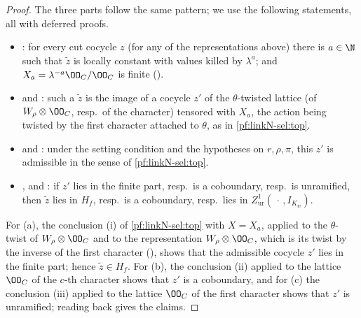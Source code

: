 \begin{proof}
The three parts follow the same pattern; we use the following statements, all with deferred proofs.
\begin{itemize}
\item {}: for every cut cocycle $z$ (for any of the representations
above) there is $a\in\N$ such that $\tilde z$ is locally constant with values killed by $\lambda^a$; and $X_a=\lambda^{-a}\OO_C/\OO_C$ is finite
().
\item {} and
: such a $\tilde z$ is the image of a cocycle $z'$ of the
$\theta$-twisted lattice (of $W_\rho\otimes\OO_C$, resp.\ of the character) tensored with $X_a$, the action being twisted by the first character
attached to $\theta$, as in \cref{pf:linkN-sel:top}.
\item {} and
: under the setting condition and the hypotheses on
$r,\rho,\pi$, this $z'$ is admissible in the sense of \cref{pf:linkN-sel:top}.
\item {},
 and
: if $z'$ lies in the finite part, resp.\ is a coboundary,
resp.\ is unramified, then $\tilde z$ lies in $H_f$, resp.\ is a coboundary, resp.\ lies in $Z^1_{\mathrm{ur}}(\,\cdot\,,I_{K_w})$.
\end{itemize}
For (a), the conclusion (i) of \cref{pf:linkN-sel:top} with $X=X_a$, applied to the $\theta$-twist of $W_\rho\otimes\OO_C$ and to the representation
$W_\rho\otimes\OO_C$, which is its twist by the inverse of the first character
(), shows that the admissible cocycle $z'$ lies in the
finite part; hence $\tilde z\in H_f$. For (b), the conclusion (ii) applied to the lattice $\OO_C$ of the $c$-th character shows that $z'$ is a
coboundary, and for (c) the conclusion (iii) applied to the lattice $\OO_C$ of the first character shows that $z'$ is unramified; reading back
gives the claims.
\end{proof}

